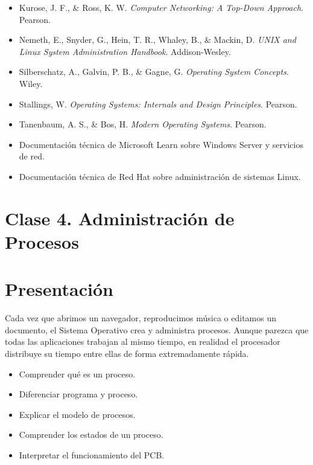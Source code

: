 \documentclass[
  spanish,
  letterpaper,
]{scrbook}
\providecommand{\tightlist}{%
  \setlength{\itemsep}{0pt}\setlength{\parskip}{0pt}}
\begin{document}
\begin{itemize}
\tightlist
\item
  Kurose, J. F., \& Ross, K. W. \emph{Computer Networking: A Top-Down
  Approach}. Pearson.
\item
  Nemeth, E., Snyder, G., Hein, T. R., Whaley, B., \& Mackin, D.
  \emph{UNIX and Linux System Administration Handbook}. Addison-Wesley.
\item
  Silberschatz, A., Galvin, P. B., \& Gagne, G. \emph{Operating System
  Concepts}. Wiley.
\item
  Stallings, W. \emph{Operating Systems: Internals and Design
  Principles}. Pearson.
\item
  Tanenbaum, A. S., \& Bos, H. \emph{Modern Operating Systems}. Pearson.
\item
  Documentación técnica de Microsoft Learn sobre Windows Server y
  servicios de red.
\item
  Documentación técnica de Red Hat sobre administración de sistemas
  Linux.
\end{itemize}


\chapter{Clase 4. Administración de
Procesos}\label{clase-4.-administraciuxf3n-de-procesos}


\chapter{Presentación}\label{presentaciuxf3n}

Cada vez que abrimos un navegador, reproducimos música o editamos un
documento, el Sistema Operativo crea y administra procesos. Aunque
parezca que todas las aplicaciones trabajan al mismo tiempo, en realidad
el procesador distribuye su tiempo entre ellas de forma extremadamente
rápida.

\begin{tcolorbox}[enhanced jigsaw, arc=.35mm, bottomrule=.15mm, bottomtitle=1mm, breakable, colback=white, colbacktitle=quarto-callout-tip-color!10!white, colframe=quarto-callout-tip-color-frame, coltitle=black, left=2mm, leftrule=.75mm, opacityback=0, opacitybacktitle=0.6, rightrule=.15mm, title=\textcolor{quarto-callout-tip-color}{\faLightbulb}\hspace{0.5em}{Objetivos}, titlerule=0mm, toprule=.15mm, toptitle=1mm]

\begin{itemize}
\tightlist
\item
  Comprender qué es un proceso.
\item
  Diferenciar programa y proceso.
\item
  Explicar el modelo de procesos.
\item
  Comprender los estados de un proceso.
\item
  Interpretar el funcionamiento del PCB.
\end{itemize}

\end{tcolorbox}
\end{document}
